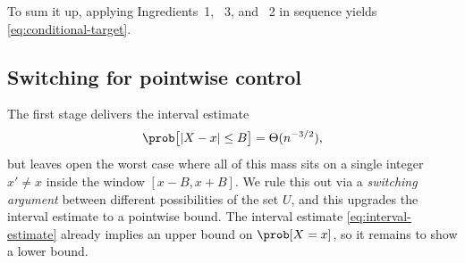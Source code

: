 To sum it up, applying Ingredients~1, ~3, and ~2 in sequence yields \eqref{eq:conditional-target}.


\subsection{Switching for pointwise control}
\label{sec:switching}

The first stage delivers the interval estimate 
\[
\prob\bigl[|X - x| \leq B\bigr] = \Theta(n^{-3/2}),
\]
but leaves open the worst case where all of this mass sits on a single integer $x' \ne x$ inside the window $[x - B, x + B]$. We rule this out via a \textit{switching argument} between different possibilities of the set $U$, and this upgrades the interval estimate to a pointwise bound. The interval estimate \eqref{eq:interval-estimate} already implies an upper bound on $\prob[X = x]$, so it remains to show a lower bound.

